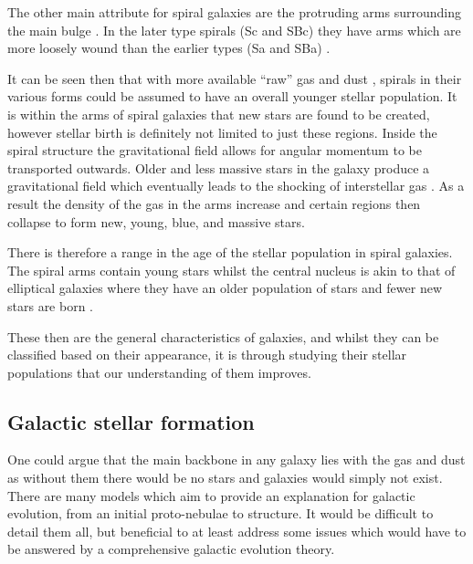 \documentclass[12pt, twocolumn]{revtex4}    %
\begin{document}
The other main attribute for spiral galaxies are the protruding arms surrounding the main bulge \citep{carroll_astro}. In the later type spirals (Sc and SBc) they have arms which are more loosely wound than the earlier types (Sa and SBa) \citep{moore_databook}.

It can be seen then that with more available ``raw'' gas and dust \citep{carroll_astro}, spirals in their various forms could be assumed to have an overall younger stellar population. It is within the arms of spiral galaxies that new stars are found to be created, however stellar birth is definitely not limited to just these regions. Inside the spiral structure the gravitational field allows for angular momentum to be transported outwards. Older and less massive stars in the galaxy produce a gravitational field which eventually leads to the shocking of interstellar gas \citep{binney_galaxies}. As a result the density of the gas in the arms increase and certain regions then collapse to form new, young, blue, and massive stars. 

There is therefore a range in the age of the stellar population in spiral galaxies. The spiral arms contain young stars whilst the central nucleus is akin to that of elliptical galaxies where they have an older population of stars and fewer new stars are born \citep{carroll_astro, binney_galaxies}.

These then are the general characteristics of galaxies, and whilst they can be classified based on their appearance, it is through studying their stellar populations that our understanding of them improves. 


\subsection{Galactic stellar formation}


One could argue that the main backbone in any galaxy lies with the gas and dust as without them there would be no stars and galaxies would simply not exist. There are many models which aim to provide an explanation for galactic evolution, from an initial proto-nebulae to structure. It would be difficult to detail them all, but beneficial to at least address some issues which would have to be answered by a comprehensive galactic evolution theory. 
\end{document}
